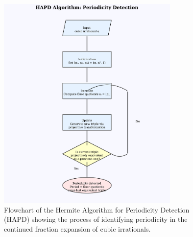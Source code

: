 
\begin{figure}[ht]
\centering
\includegraphics[width=0.8\textwidth]{../figures/output/hapd_algorithm_flowchart.pdf}

\caption{Flowchart of the Hermite Algorithm for Periodicity Detection (HAPD) showing the process of identifying periodicity in the continued fraction expansion of cubic irrationals.}
\label{fig:hapd_flowchart}
\end{figure} 